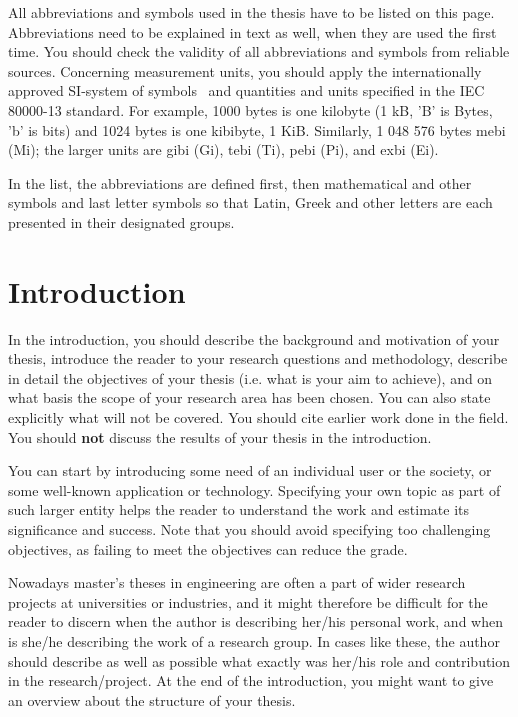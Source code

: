 All abbreviations and symbols used in the thesis have to be listed on this page. Abbreviations need to be explained in text as well, when they are used the first time. You should check the validity of all abbreviations and symbols from reliable sources. Concerning measurement units, you should apply the internationally approved SI-system of symbols~\cite{siopas, systemofunits} and quantities and units specified in the IEC 80000-13 standard. For example, 1000 bytes is one kilobyte (1 kB, 'B' is Bytes, 'b' is bits) and 1024 bytes is one kibibyte, 1 KiB. Similarly, 1 048 576 bytes mebi (Mi); the larger units are gibi (Gi), tebi (Ti), pebi (Pi), and exbi (Ei).

In the list, the abbreviations are defined first, then mathematical and other symbols and last letter symbols so that Latin, Greek and other letters are each presented in their designated groups. 

\section{Introduction}

In the introduction, you should describe the background and motivation of your thesis, introduce the reader to your research questions and methodology, describe in detail the objectives of your thesis (i.e. what is your aim to achieve), and on what basis the scope of your research area has been chosen. You can also state explicitly what will not be covered. You should cite earlier work done in the field. You should \textbf{not} discuss the results of your thesis in the introduction.

You can start by introducing some need of an individual user or the society, or some well-known application or technology. Specifying your own topic as part of such larger entity helps the reader to understand the work and estimate its significance and success. Note that you should avoid specifying too challenging objectives, as failing to meet the objectives can reduce the grade.

Nowadays master’s theses in engineering are often a part of wider research projects at universities or industries, and it might therefore be difficult for the reader to discern when the author is describing her/his personal work, and when is she/he describing the work of a research group. In cases like these, the author should describe as well as possible what exactly was her/his role and contribution in the research/project. At the end of the introduction, you might want to give an overview about the structure of your thesis.

